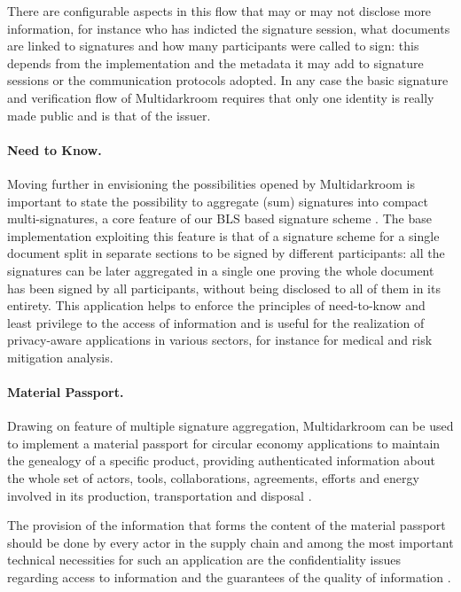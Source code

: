 \documentclass[twocolumn]{article}
\begin{document}
There are configurable aspects in this flow that may or may not disclose
more information, for instance who has indicted the signature session,
what documents are linked to signatures and how many participants were
called to sign: this depends from the implementation and the metadata it
may add to signature sessions or the communication protocols adopted. 
In any case the basic signature and verification flow of Multidarkroom requires that only one identity is really made public and is that of the issuer. 

\paragraph*{Need to Know.}
Moving further in envisioning the possibilities opened by Multidarkroom
is important to state the possibility to aggregate (sum) signatures into
compact multi-signatures, a core feature of our BLS based signature
scheme \citep{compact-multisig}. The base implementation exploiting this
feature is that of a signature scheme for a single document split in
separate sections to be signed by different participants: all the
signatures can be later aggregated in a single one proving the whole
document has been signed by all participants, without being disclosed to
all of them in its entirety. This application helps to enforce the
principles of need-to-know and least privilege to the access of
information \citep{info-protection} and is useful for the realization of
privacy-aware applications in various sectors, for instance for medical
and risk mitigation analysis.

\paragraph*{Material Passport.}
Drawing on feature of multiple signature aggregation, Multidarkroom can
be used to implement a {material passport} for circular economy
applications \citep{material-passport} to maintain the genealogy of a
specific product, providing authenticated information about  the whole
set of actors, tools, collaborations, agreements, efforts and energy
involved in its production, transportation and disposal
\citep{reflow-os}.

The provision of the information that forms the content of the material
passport should be done by every actor in the supply chain and among the
most important technical necessities for such an application are the
confidentiality issues regarding access to information and the
guarantees of the quality of information \citep{resources-passport}.
\end{document}
